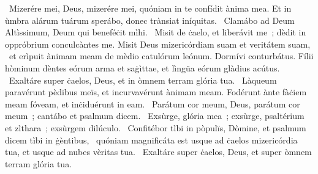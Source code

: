 \psalmChapterWithInscription{}
{ }
{%
~Mizerére mei, Deus, mizerére mei, quóniam in te confídit ànima mea. Et in ùmbra alárum tuárum sperábo, donec trànsiat iníquitas. 
~Clamábo ad Deum Altìssimum, Deum qui beneféċit mìhi. 
~Misit de ċaelo, et liberávit me~; dèdit in oppróbrium conculcàntes me. Misit Deus mizericórdiam suam et veritátem suam, 
~et erìpuit ànimam meam de mèdio catulórum leónum. Dormívi conturbátus. Fílii hòminum dèntes eórum arma et saġìttae, et lìngüa eórum glàdius acútus. 
~Exaltáre super ċaelos, Deus, et in òmnem terram glória tua. 
~Làqueum paravérunt pèdibus meïs, et incurvavérunt ànimam meam. Fodérunt ànte fàċiem meam fóveam, et inċiduérunt in eam. 
~Parátum cor meum, Deus, parátum cor meum~; cantábo et psalmum dicem. 
~Exsùrge, glória mea~; exsùrge, psaltérium et zìthara~; exsùrgem dilúculo. 
~Confitébor tìbi in pòpulïs, Dòmine, et psalmum dicem tìbi in ġèntibus, 
~quóniam magnificáta est usque ad ċaelos mizericórdia tua, et usque ad nubes vèritas tua. 
~Exaltáre super ċaelos, Deus, et super òmnem terram glória tua. 
}
